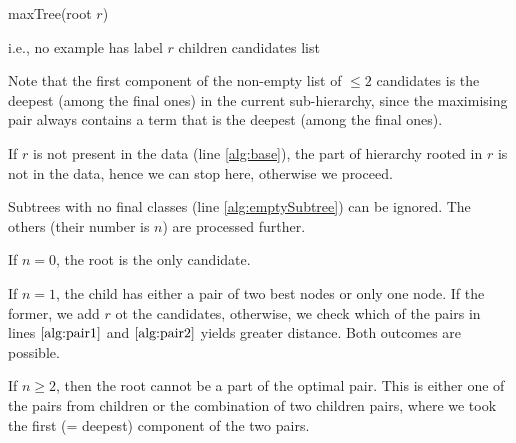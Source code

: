 \documentclass[12pt,a4paper]{article}
\begin{document}
\begin{algorithm}[H]
	\caption{maxTree(root $r$)}\label{alg:rec}
	\begin{algorithmic}[1]
		\label{alg:base}
			\hfill i.e., no example has label $r$
		\ENDIF
		\hfill children candidates list
			\label{alg:emptySubtree}
		\ENDFOR
			\ELSE
				\label{alg:pair1}
				\label{alg:pair2}
			\ENDIF
		\ELSE
		\ENDIF
	\end{algorithmic}  
\end{algorithm}
Note that the first component of the non-empty list of $\leq 2$ candidates is the deepest
(among the final ones) in the current sub-hierarchy, since the maximising pair always contains
 a term that is the deepest (among the final ones).
 
If $r$ is not present in the data (line \ref{alg:base}), the part of hierarchy rooted in $r$ is not in the data, hence we
can stop here, otherwise we proceed.

Subtrees with no final classes (line \ref{alg:emptySubtree}) can be ignored. The others (their number is $n$) are processed further.

If $n = 0$, the root is the only candidate.

If $n = 1$, the child has either a pair of two best nodes or only one node.
If the former, we add $r$ ot the candidates, otherwise, we check which of the pairs in lines $\ref{alg:pair1}$ and $\ref{alg:pair2}$
yields greater distance. Both outcomes are possible.

If $n \geq 2$, then the root cannot be a part of the optimal pair. This is either one of the pairs from children or
the combination of two children pairs, where we took the first (= deepest) component of the two pairs.
\end{document}
